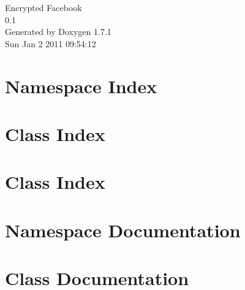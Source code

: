 \documentclass[a4paper]{book}
\begin{document}
\hypersetup{pageanchor=false}
\begin{titlepage}
\vspace*{7cm}
\begin{center}
{\Large Encrypted Facebook \\[1ex]\large 0.1 }\\
\vspace*{1cm}
{\large Generated by Doxygen 1.7.1}\\
\vspace*{0.5cm}
{\small Sun Jan 2 2011 09:54:12}\\
\end{center}
\end{titlepage}
\clearemptydoublepage
{}
\tableofcontents
\clearemptydoublepage
{}
\hypersetup{pageanchor=true}
\chapter{Namespace Index}

\chapter{Class Index}

\chapter{Class Index}

\chapter{Namespace Documentation}

\chapter{Class Documentation}

















\printindex
\end{document}
